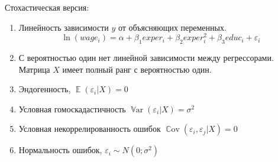 \documentclass[addpoints]{exam} %
\DeclareMathOperator{\E}{\mathbb{E}}
\DeclareMathOperator{\Var}{\mathbb{V}\mathrm{ar}}
\DeclareMathOperator{\Cov}{\mathbb{C}\mathrm{ov}}
\begin{document}
\begin{questions}
\begin{parts}
\begin{solution}
Стохастическая версия:

\begin{enumerate}
\item Линейность зависимости $y$ от объясняющих переменных. 
\[
\ln(wage_i) = \alpha + \beta_1 exper_i + \beta_2 exper_i^2 + \beta_3 educ_i  + \varepsilon_i
\]
\item С вероятностью один нет линейной зависимости между регрессорами. Матрица $X$ имеет полный ранг с вероятностью один.
\item Эндогенность, $\E(\varepsilon_i | X)=0$
\item Условная гомоскадастичность $\Var(\varepsilon_i |X)=\sigma^2$
\item Условная некоррелированность ошибок $\Cov(\varepsilon_i,\varepsilon_j |X)=0$
\item Нормальность ошибок, $\varepsilon_i \sim N(0;\sigma^2)$
\end{enumerate}

\end{solution}

\end{parts}

\end{questions}
\end{document}
